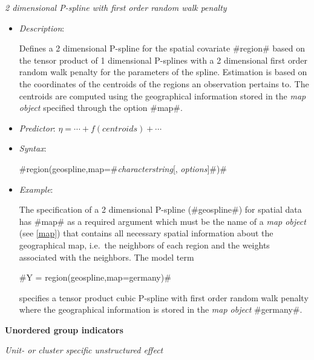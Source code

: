 \newpage

{\em 2 dimensional P-spline with first order random walk penalty}

\begin{itemize}
\item[] {\em Description}:

Defines a 2 dimensional P-spline for the spatial covariate
#region# based on the tensor product of 1 dimensional P-splines
with a 2 dimensional first order random walk penalty for the
parameters of the spline. Estimation is based on the coordinates
of the centroids of the regions an observation pertains to. The
centroids are computed using the geographical information stored
in the {\em map object} specified through the option #map#.
\item[] {\em Predictor}: $\eta= \cdots + f(centroids) + \cdots$
\item[] {\em Syntax}:

#region(geospline,map=#{\em characterstring}[, {\em options}]#)#
\item[] {\em Example}:

The specification of a 2 dimensional P-spline  (#geospline#) for
spatial data has #map# as a required argument which must be the
name of a {\em map object} (see \autoref{map}) that contains all
necessary spatial information about the geographical map, i.e.~the
neighbors of each region and the weights associated with the
neighbors. The model term

#Y = region(geospline,map=germany)#

specifies a tensor product cubic P-spline with first order random
walk penalty where the geographical information is stored in the
{\em map object} #germany#.
\end{itemize}

\vspace{0.5cm}

{\bf Unordered group indicators}
\medskip

{\em Unit- or cluster specific unstructured effect}

